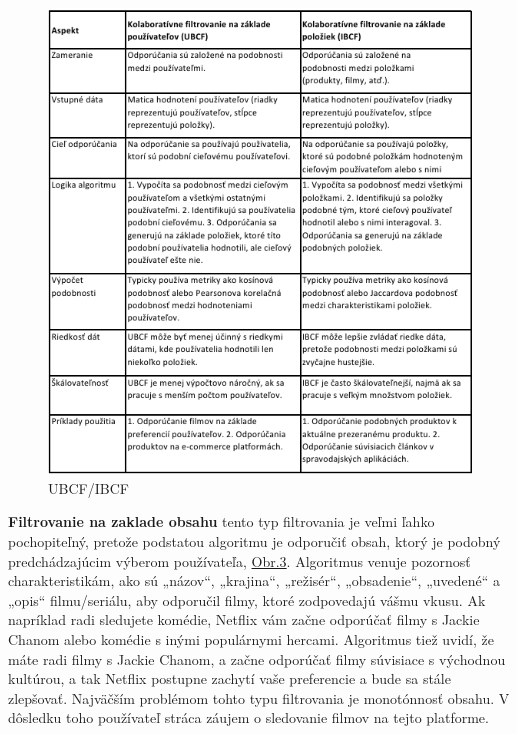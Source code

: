 \documentclass[10pt,slovak,a4paper]{article}
\begin{document}
\begin{figure}[H]
  \centering
  \includegraphics[width=1\textwidth]{Images_tables/table_filtering.png} 
  \caption{UBCF/IBCF}
\end{figure}

\textbf{Filtrovanie na zaklade obsahu} tento typ filtrovania je veľmi ľahko pochopiteľný, pretože podstatou algoritmu je odporučiť obsah, ktorý je podobný predchádzajúcim výberom používateľa, \hyperref[Types:of:filtering]{Obr.3}. Algoritmus venuje pozornosť charakteristikám, ako sú „názov“, „krajina“, „režisér“, „obsadenie“, „uvedené“ a „opis“ filmu/seriálu, aby odporučil filmy, ktoré zodpovedajú vášmu vkusu.\cite{Fil:obsah} Ak napríklad radi sledujete komédie, Netflix vám začne odporúčať filmy s Jackie Chanom alebo komédie s inými populárnymi hercami. Algoritmus tiež uvidí, že máte radi filmy s Jackie Chanom, a začne odporúčať filmy súvisiace s východnou kultúrou, a tak Netflix postupne zachytí vaše preferencie a bude sa stále zlepšovať. Najväčším problémom tohto typu filtrovania je monotónnosť obsahu. V dôsledku toho používateľ stráca záujem o sledovanie filmov na tejto platforme.\cite{Fil:alg:obsah}
\end{document}
